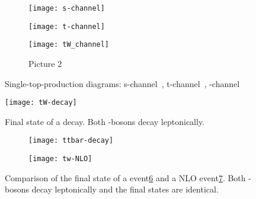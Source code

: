 \begin{figure}[htbp]
  \begin{subfigure}[b]{0.3\textwidth}
  	\centering
    \texttt{[image: s-channel]}
    \caption{}
    \label{fig:singletop:virtualWt}
  \end{subfigure}
  \quad
  \begin{subfigure}[b]{0.3\textwidth}
  	\centering
    \texttt{[image: t-channel]}
    \caption{}
    \label{fig:singletop:virtualWs}
  \end{subfigure}
  \quad
  \begin{subfigure}[b]{0.3\textwidth}
  	\centering
    \texttt{[image: tW\_channel]}
    \caption{Picture 2}
	\label{fig:singletop:tW}
  \end{subfigure} 
  \caption[Single-top-production diagrams]{Single-top-production diagrams: s-channel~, t-channel~, \tW-channel~}
  \label{fig:singletop}
\end{figure}


\begin{figure}[htbp]
	\centering
	\texttt{[image: tW-decay]}
	\caption[Final state of a \tW decay]{Final state of a \tW decay. Both \PW-bosons decay leptonically.}
	\label{fig:tw-decay}
\end{figure}

\begin{figure}[htbp]
    \centering
    \begin{subfigure}[b]{0.44\textwidth}
        \texttt{[image: ttbar-decay]}
        \caption{}
        \label{fig:nlo:ttbar}
    \end{subfigure}
\quad
    \begin{subfigure}[b]{0.44\textwidth}
        \texttt{[image: tw-NLO]}
        \caption{}
        \label{fig:nlo:tw}
    \end{subfigure}
    \caption[Comparison of the final state of a \ttbar and \tW event]{Comparison of the final state of a \ttbar event\ref{fig:nlo:ttbar} and a NLO \tW event\ref{fig:nlo:tw}. Both \PW-bosons decay leptonically and the final states are identical.}
	\label{fig:nlo}
\end{figure}